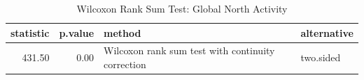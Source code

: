 \begin{table}[ht]
\centering
\begin{tabular}{rrll}
  \hline
statistic & p.value & method & alternative \\ 
  \hline
431.50 & 0.00 & Wilcoxon rank sum test with continuity correction & two.sided \\ 
   \hline
\end{tabular}
\caption{Wilcoxon Rank Sum Test: Global North Activity} 
\end{table}
